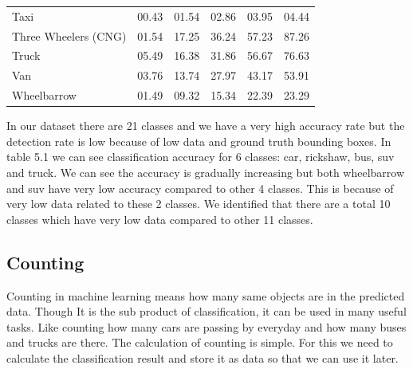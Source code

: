 \begin{table}[!h]
{\begin{tabular}{p{4.3cm} p{1cm} p{1cm} p{1cm} p{1cm} p{1cm}}
          Taxi                        & 00.43    &  01.54 & 02.86  & 03.95   & 04.44  \\
          Three Wheelers (CNG)        & 01.54    &  17.25 & 36.24  & 57.23   & 87.26  \\
          Truck                       & 05.49    &  16.38 & 31.86  & 56.67   & 76.63  \\
          Van                         & 03.76    &  13.74 & 27.97  & 43.17   & 53.91  \\
          Wheelbarrow                 & 01.49    &  09.32 & 15.34  & 22.39   & 23.29  \\
          \bottomrule
    \end{tabular}
  }
\end{table}



In our dataset there are 21 classes and we have a very high accuracy rate but the detection rate is low because of low data and ground truth bounding boxes. In table 5.1 we can see classification accuracy for 6 classes: car, rickshaw, bus, suv and truck. We can see the accuracy is gradually increasing but both wheelbarrow and suv have very low accuracy compared to other 4 classes. This is because of very low data related to these 2 classes. We identified that there are a total 10 classes which have very low data compared to other 11 classes. 


\subsection{Counting} Counting in machine learning means how many same objects are in the predicted data. Though It is the sub product of classification, it can be used in many useful tasks. Like counting how many cars are passing by everyday and how many buses and trucks are there. The calculation of counting is simple. For this we need to calculate the classification result and store it as data so that we can use it later.

